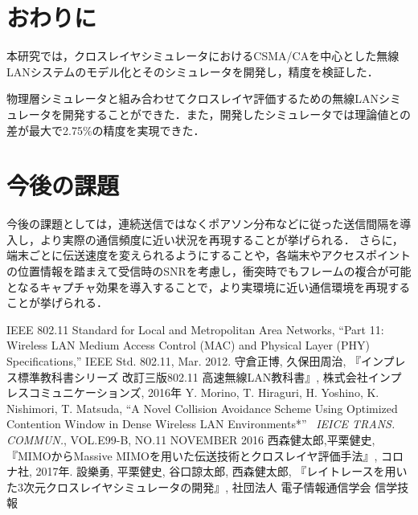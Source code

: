\documentclass[a4paper,10pt]{ltjsarticle}
\begin{document}
\clearpage
\section{おわりに}

本研究では，クロスレイヤシミュレータにおけるCSMA/CAを中心とした無線LANシステムのモデル化とそのシミュレータを開発し，精度を検証した．

物理層シミュレータと組み合わせてクロスレイヤ評価するための無線LANシミュレータを開発することができた．また，開発したシミュレータでは理論値との差が最大で2.75\%の精度を実現できた．

\clearpage
\section{今後の課題}

今後の課題としては，連続送信ではなくポアソン分布などに従った送信間隔を導入し，より実際の通信頻度に近い状況を再現することが挙げられる．
さらに，端末ごとに伝送速度を変えられるようにすることや，各端末やアクセスポイントの位置情報を踏まえて受信時のSNRを考慮し，衝突時でもフレームの複合が可能となるキャプチャ効果を導入することで，より実環境に近い通信環境を再現することが挙げられる．


\clearpage
{}
\begin{thebibliography}{99}
  
  IEEE 802.11 Standard for Local and Metropolitan Area
  Networks, “Part 11: Wireless LAN Medium Access Control (MAC) and Physical Layer (PHY) Speciﬁcations,”  IEEE Std. 802.11, Mar. 2012.
守倉正博, 久保田周治, 『インプレス標準教科書シリーズ 改訂三版802.11 高速無線LAN教科書』, 株式会社インプレスコミュニケーションズ, 2016年
Y. Morino, T. Hiraguri, H. Yoshino, K. Nishimori, T. Matsuda, ``A Novel Collision Avoidance Scheme Using Optimized Contention Window in Dense Wireless LAN Environments*'' \, \textit{IEICE TRANS. COMMUN.}, VOL.E99-B, NO.11 NOVEMBER 2016
西森健太郎,平栗健史,『MIMOからMassive MIMOを用いた伝送技術とクロスレイヤ評価手法』, コロナ社, 2017年.
設樂勇, 平栗健史, 谷口諒太郎, 西森健太郎, 『レイトレースを用いた3次元クロスレイヤシミュレータの開発』, 社団法人 電子情報通信学会 信学技報
\end{thebibliography}
\end{document}
